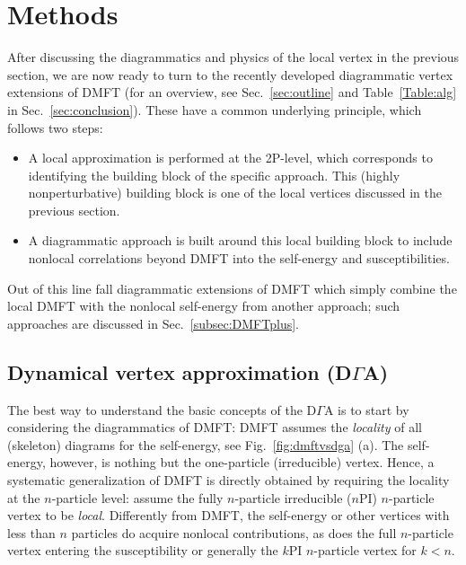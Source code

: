 \documentclass[rmp,aps,reprint,amsmath,amssymb,superscriptaddress,showpacs,nofootinbib]{revtex4-1}
\begin{document}
\section{Methods}
\label{Sec:Methods}

After discussing the diagrammatics and physics of the local vertex in the previous section, we are now ready to turn to the recently developed diagrammatic vertex extensions of DMFT (for an overview, see  Sec.~\ref{sec:outline} and  Table~\ref{Table:alg} in Sec.~\ref{sec:conclusion}). These have a common underlying principle, which follows two steps:

\begin{itemize}
\item A local approximation is performed at the 2P-level, which corresponds to identifying the building block of the specific approach. This  (highly nonperturbative) building block is one of the local vertices discussed in the previous section.

\item A diagrammatic approach is built around this local building block to include nonlocal correlations beyond DMFT into the self-energy and susceptibilities.
\end{itemize}

Out of this line fall diagrammatic extensions of DMFT which simply combine the local DMFT  with the nonlocal self-energy from another approach; such approaches are discussed in  Sec.~\ref{subsec:DMFTplus}.

\subsection{Dynamical vertex approximation (D\texorpdfstring{$\Gamma$}{G}A)}
\label{sec:dga}

The best way to understand the basic concepts of the D$\Gamma$A is to start by considering the diagrammatics of DMFT: DMFT assumes the {\sl locality} of all (skeleton)  diagrams for the self-energy, see Fig.~\ref{fig:dmftvsdga} (a). The self-energy, however, is nothing but the one-particle (irreducible) vertex. Hence, a systematic generalization of DMFT is directly  obtained by requiring the locality at the $n$-particle level:  assume  the fully $n$-particle irreducible ($n$PI) $n$-particle vertex to be {\sl local}. Differently from DMFT,   the self-energy or other vertices with less than $n$ particles  do  acquire nonlocal contributions,  as does the full  $n$-particle vertex entering the susceptibility or generally the $k$PI  $n$-particle vertex for $k<n$. 
\end{document}
